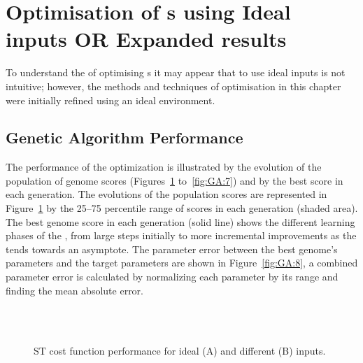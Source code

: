 \section{Optimisation of {\BNN}s using Ideal inputs \textbf{OR} Expanded results}

To understand the of optimising {\BNN}s it may appear that to use ideal
inputs is not intuitive; however, the methods and techniques of {\GA}
optimisation in this chapter were initially refined using an ideal
environment.



\subsection{Genetic Algorithm Performance}



The performance of the {\GA} optimization is illustrated by the evolution
of the population of genome scores (Figures~\ref{fig:GA:5}
to~\ref{fig:GA:7}) and by the best score in each generation. The
evolutions of the population scores are represented in
Figure~\ref{fig:GA:5} by the 25--75 percentile range of scores in each
generation (shaded area). The best genome score in each generation
(solid line) shows the different learning phases of the {\GA}, from large
steps initially to more incremental improvements as the {\GA} tends
towards an asymptote. The parameter error between the best genome's
parameters and the target parameters are shown in Figure~\ref{fig:GA:8},
a combined parameter error is calculated by normalizing each parameter
by its range and finding the mean absolute error.

\smallskip{}

\begin{figure}[htb]
\centering
{}\hspace{2.2in} \hfill \\
\hfill\\
 \caption{ST cost function {\GA} performance for ideal (A) and different (B) inputs.}\label{fig:GA:5}
\end{figure}

